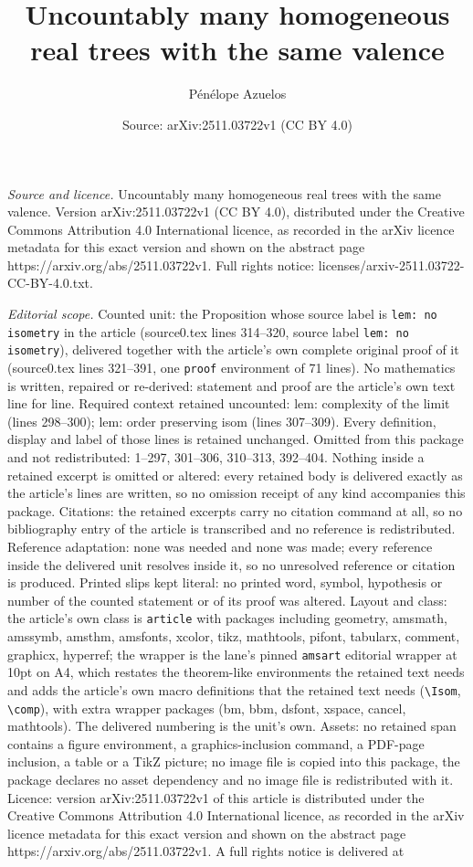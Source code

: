 \documentclass[10pt,a4paper]{amsart}
\title[Uncountably many homogeneous real trees with the same valenc]{Uncountably many homogeneous real trees with the same valence}
\author{P\'en\'elope Azuelos}
\date{Source: arXiv:2511.03722v1 (CC BY 4.0)}
\begin{document}
\maketitle

\noindent\emph{Source and licence.} Uncountably many homogeneous real trees with the same valence. Version arXiv:2511.03722v1 (CC BY 4.0), distributed under the Creative Commons Attribution 4.0 International licence, as recorded in the arXiv licence metadata for this exact version and shown on the abstract page https://arxiv.org/abs/2511.03722v1. Full rights notice: licenses/arxiv-2511.03722-CC-BY-4.0.txt.\par\smallskip

\noindent\textit{Editorial scope.} Counted unit: the Proposition whose source label is \texttt{lem: no isometry} in the article (source0.tex lines 314--320, source label \texttt{lem: no isometry}), delivered together with the article's own complete original proof of it (source0.tex lines 321--391, one \texttt{proof} environment of 71 lines). No mathematics is written, repaired or re-derived: statement and proof are the article's own text line for line. Required context retained uncounted: lem: complexity of the limit (lines 298--300); lem: order preserving isom (lines 307--309). Every definition, display and label of those lines is retained unchanged. Omitted from this package and not redistributed: 1--297, 301--306, 310--313, 392--404. Nothing inside a retained excerpt is omitted or altered: every retained body is delivered exactly as the article's lines are written, so no omission receipt of any kind accompanies this package. Citations: the retained excerpts carry no citation command at all, so no bibliography entry of the article is transcribed and no reference is redistributed. Reference adaptation: none was needed and none was made; every reference inside the delivered unit resolves inside it, so no unresolved reference or citation is produced. Printed slips kept literal: no printed word, symbol, hypothesis or number of the counted statement or of its proof was altered. Layout and class: the article's own class is \texttt{article} with packages including geometry, amsmath, amssymb, amsthm, amsfonts, xcolor, tikz, mathtools, pifont, tabularx, comment, graphicx, hyperref; the wrapper is the lane's pinned \texttt{amsart} editorial wrapper at 10pt on A4, which restates the theorem-like environments the retained text needs and adds the article's own macro definitions that the retained text needs (\texttt{\textbackslash Isom}, \texttt{\textbackslash comp}), with extra wrapper packages (bm, bbm, dsfont, xspace, cancel, mathtools). The delivered numbering is the unit's own. Assets: no retained span contains a figure environment, a graphics-inclusion command, a PDF-page inclusion, a table or a TikZ picture; no image file is copied into this package, the package declares no asset dependency and no image file is redistributed with it. Licence: version arXiv:2511.03722v1 of this article is distributed under the Creative Commons Attribution 4.0 International licence, as recorded in the arXiv licence metadata for this exact version and shown on the abstract page https://arxiv.org/abs/2511.03722v1. A full rights notice is delivered at 
\end{document}
